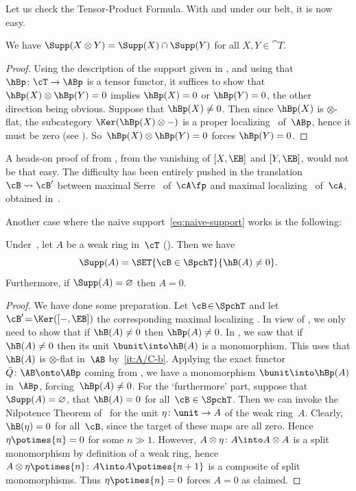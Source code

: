 Let us check the Tensor-Product Formula. With  and  under our belt, it is now easy.
\begin{Thm}
\label{Thm:TPF}
We have $\Supp(X\otimes Y)=\Supp(X)\cap\Supp(Y)$ for all $X,Y\in \cat{T}$.
\end{Thm}

\begin{proof}
Using the description of the support given in , and using that $\hBp\colon \cT\to \ABp$ is a tensor functor, it suffices to show that $\hBp(X)\otimes \hBp(Y)=0$ implies $\hBp(X)=0$ or $\hBp(Y)=0$, the other direction being obvious. Suppose that $\hBp(X)\neq 0$. Then since $\hBp(X)$ is $\otimes$-flat, the subcategory $\Ker(\hBp(X)\otimes-)$ is a proper localizing \tensid\ of~$\ABp$, hence it must be zero (see ). So~$\hBp(X)\otimes \hBp(Y)=0$ forces $\hBp(Y)=0$.
\end{proof}

\begin{Rem}
A heads-on proof of  from , \ie from the vanishing of $[X,\EB]$ and $[Y,\EB]$, would not be that easy. The difficulty has been entirely pushed in the translation $\cB\leadsto\cB'$ between maximal Serre \tensids\ of~$\cA\fp$ and maximal localizing \tensids\ of~$\cA$, obtained in~.
\end{Rem}

Another case where the naive support~\eqref{eq:naive-support} works is the following:

\begin{Thm}
\label{Thm:rings}
Under~, let $A$ be a weak ring in~$\cT$ (). Then we have
\[
\Supp(A)=\SET{\cB\in\SpchT}{\hB(A)\neq 0}.
\]
Furthermore, if $\Supp(A)=\varnothing$ then $A=0$.
\end{Thm}

\begin{proof}
We have done some preparation. Let $\cB\!\in\!\SpchT$ and let ${\cB'}\!=\!\Ker([-,\EB])$ the corresponding maximal localizing \tensid. In view of , we only need to show that if $\hB(A)\neq0$ then $\hBp(A)\neq0$. In , we saw that if $\hB(A)\neq0$ then its unit $\bunit\into \hB(A)$ is a monomorphism. This uses that $\hB(A)$ is $\otimes$-flat in~$\AB$ by \,\eqref{it:A/C-b}. Applying the exact functor $\bar Q\colon \AB\onto \ABp$ coming from , we have a monomorphism $\bunit\into \hBp(A)$ in~$\ABp$, forcing~$\hBp(A)\neq0$. For the `furthermore' part, suppose that $\Supp(A)=\varnothing$, \ie that $\hB(A)=0$ for all~$\cB\in\SpchT$. Then we can invoke the Nilpotence Theorem of~\cite{Balmer20a} for the unit $\eta\colon\unit\to A$ of the weak ring~$A$. Clearly, $\hB(\eta)=0$ for all~$\cB$, since the target of these maps are all zero. Hence $\eta\potimes{n}=0$ for some $n\gg1$. However, $A\otimes\eta\colon A\into A\otimes A$ is a split monomorphism by definition of a weak ring, hence $A\otimes\eta\potimes{n}\colon A\into A\potimes{n+1}$ is a composite of split monomorphisms. Thus $\eta\potimes{n}=0$ forces $A=0$ as claimed.
\end{proof}

